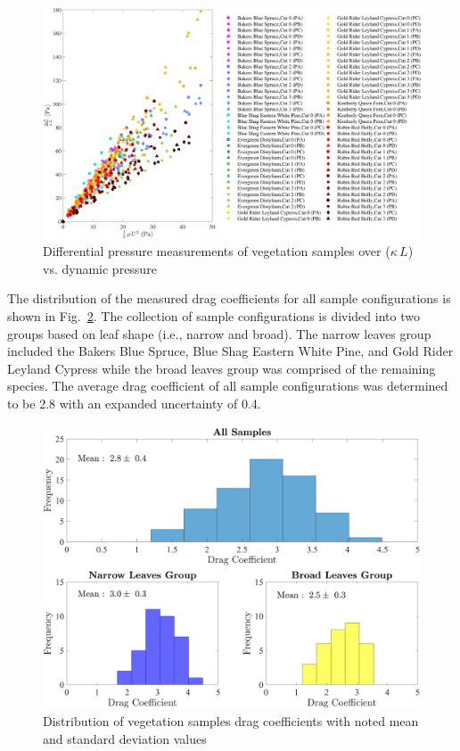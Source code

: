 \documentclass[12pt]{article}
\begin{document}
\begin{figure}
	\centering
	\includegraphics[width=\textwidth,keepaspectratio]{Picture9.pdf}
	\caption{Differential pressure measurements of vegetation samples over ($\kappa \, L$) vs. dynamic pressure}
	\label{fig:DPoveraf(Overall)}
\end{figure}

The distribution of the measured drag coefficients for all sample configurations is shown in Fig.~\ref{fig:Histogram}. The collection of sample configurations is divided into two groups based on leaf shape (i.e., narrow and broad). The narrow leaves group included the Bakers Blue Spruce, Blue Shag Eastern White Pine, and Gold Rider Leyland Cypress while the broad leaves group was comprised of the remaining species. The average drag coefficient of all sample configurations was determined to be 2.8 with an expanded uncertainty of 0.4.

\begin{figure}[!]
\includegraphics[width=\textwidth,keepaspectratio]{Picture11.pdf}
	\caption[Distribution of drag coefficients for all samples (top), samples with narrow leaves (bottom left), samples with broad leaves (bottom right)]{Distribution of vegetation samples drag coefficients with noted mean and standard deviation values}
	\label{fig:Histogram}
\end{figure}
\end{document}
